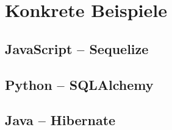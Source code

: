 
\chapter{Konkrete Beispiele} %

\label{Chapter3} %

\section{JavaScript – Sequelize}



\section{Python – SQLAlchemy}



\section{Java – Hibernate}


